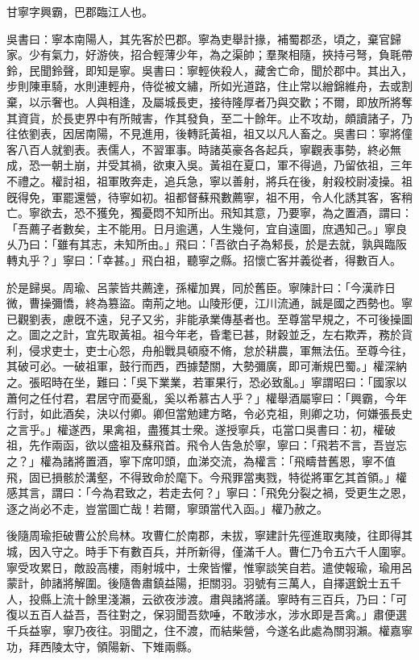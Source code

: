 
\begin{pinyinscope}
甘寧字興霸，巴郡臨江人也。

吳書曰：寧本南陽人，其先客於巴郡。寧為吏舉計掾，補蜀郡丞，頃之，棄官歸家。少有氣力，好游俠，招合輕薄少年，為之渠帥；羣聚相隨，挾持弓弩，負毦帶鈴，民聞鈴聲，即知是寧。吳書曰：寧輕俠殺人，藏舍亡命，聞於郡中。其出入，步則陳車騎，水則連輕舟，侍從被文繡，所如光道路，住止常以繒錦維舟，去或割棄，以示奢也。人與相逢，及屬城長吏，接待隆厚者乃與交歡；不爾，即放所將奪其資貨，於長吏界中有所賊害，作其發負，至二十餘年。止不攻劫，頗讀諸子，乃往依劉表，因居南陽，不見進用，後轉託黃祖，祖又以凡人畜之。吳書曰：寧將僮客八百人就劉表。表儒人，不習軍事。時諸英豪各各起兵，寧觀表事勢，終必無成，恐一朝土崩，并受其禍，欲東入吳。黃祖在夏口，軍不得過，乃留依祖，三年不禮之。權討祖，祖軍敗奔走，追兵急，寧以善射，將兵在後，射殺校尉凌操。祖旣得免，軍罷還營，待寧如初。祖都督蘇飛數薦寧，祖不用，令人化誘其客，客稍亡。寧欲去，恐不獲免，獨憂悶不知所出。飛知其意，乃要寧，為之置酒，謂曰：「吾薦子者數矣，主不能用。日月逾邁，人生幾何，宜自遠圖，庶遇知己。」寧良乆乃曰：「雖有其志，未知所由。」飛曰：「吾欲白子為邾長，於是去就，孰與臨阪轉丸乎？」寧曰：「幸甚。」飛白祖，聽寧之縣。招懷亡客并義從者，得數百人。

於是歸吳。周瑜、呂蒙皆共薦達，孫權加異，同於舊臣。寧陳計曰：「今漢祚日微，曹操彌憍，終為篡盜。南荊之地。山陵形便，江川流通，誠是國之西勢也。寧已觀劉表，慮旣不遠，兒子又劣，非能承業傳基者也。至尊當早規之，不可後操圖之。圖之之計，宜先取黃祖。祖今年老，昏耄已甚，財穀並乏，左右欺弄，務於貨利，侵求吏士，吏士心怨，舟船戰具頓廢不脩，怠於耕農，軍無法伍。至尊今往，其破可必。一破祖軍，鼓行而西，西據楚關，大勢彌廣，即可漸規巴蜀。」權深納之。張昭時在坐，難曰：「吳下業業，若軍果行，恐必致亂。」寧謂昭曰：「國家以蕭何之任付君，君居守而憂亂，奚以希慕古人乎？」權舉酒屬寧曰：「興霸，今年行討，如此酒矣，決以付卿。卿但當勉建方略，令必克祖，則卿之功，何嫌張長史之言乎。」權遂西，果禽祖，盡獲其士衆。遂授寧兵，屯當口吳書曰：初，權破祖，先作兩函，欲以盛祖及蘇飛首。飛令人告急於寧，寧曰：「飛若不言，吾豈忘之？」權為諸將置酒，寧下席叩頭，血涕交流，為權言：「飛疇昔舊恩，寧不值飛，固已損骸於溝壑，不得致命於麾下。今飛罪當夷戮，特從將軍乞其首領。」權感其言，謂曰：「今為君致之，若走去何？」寧曰：「飛免分裂之禍，受更生之恩，逐之尚必不走，豈當圖亡哉！若爾，寧頭當代入函。」權乃赦之。

後隨周瑜拒破曹公於烏林。攻曹仁於南郡，未拔，寧建計先徑進取夷陵，往即得其城，因入守之。時手下有數百兵，并所新得，僅滿千人。曹仁乃令五六千人圍寧。寧受攻累日，敵設高樓，雨射城中，士衆皆懼，惟寧談笑自若。遣使報瑜，瑜用呂蒙計，帥諸將解圍。後隨魯肅鎮益陽，拒關羽。羽號有三萬人，自擇選銳士五千人，投縣上流十餘里淺瀨，云欲夜涉渡。肅與諸將議。寧時有三百兵，乃曰：「可復以五百人益吾，吾往對之，保羽聞吾欬唾，不敢涉水，涉水即是吾禽。」肅便選千兵益寧，寧乃夜往。羽聞之，住不渡，而結柴營，今遂名此處為關羽瀨。權嘉寧功，拜西陵太守，領陽新、下雉兩縣。


\end{pinyinscope}
